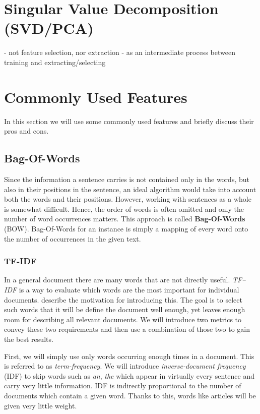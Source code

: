 \section{Singular Value Decomposition (SVD/PCA)}

 - not feature selection, nor extraction
 - as an intermediate process between training and extracting/selecting

\section{Commonly Used Features}

In this section we will use some commonly used features and briefly discuss their pros and cons.

\subsection{Bag-Of-Words}
\label{subsec:bow}

Since the information a sentence carries is not contained only in the words, but also in their positions in the sentence, an ideal algorithm would take into account both the words and their positions.
However, working with sentences as a whole is somewhat difficult. Hence, the order of words is often omitted and only the number of word occurrences matters.
This approach is called {\bf Bag-Of-Words} (BOW). Bag-Of-Words for an instance is simply a mapping of every word onto the number of occurrences in the given text.

\subsubsection{TF-IDF}

In a general document there are many words that are not directly useful.
{\it TF--IDF} is a way to evaluate which words are the most important for individual documents.  
\citet{SalBuc88} describe the motivation for introducing this.
The goal is to select such words that it will be define the document well enough, yet leaves enough room for describing all relevant documents.
We will introduce two metrics to convey these two requirements and then use a combination of those two to gain the best results.

First, we will simply use only words occurring enough times in a document. This is referred to as {\it term-frequency}.
We will introduce {\it inverse-document frequency} (IDF) to skip words such as {\it an}, {\it the} which appear in virtually every sentence and carry very little information.
IDF is indirectly proportional to the number of documents which contain a given word.
Thanks to this, words like articles will be given very little weight.

